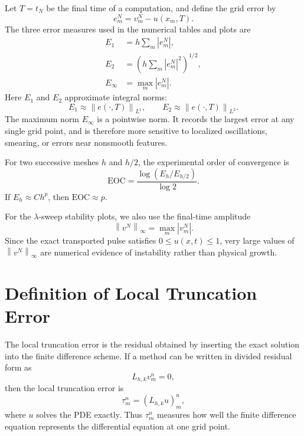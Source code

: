 \documentclass[11pt]{article}
\newcommand{\eoc}{\mathrm{EOC}}
\newcommand{\norm}[1]{\left\lVert #1\right\rVert}
\begin{document}
Let $T=t_N$ be the final time of a computation, and define the grid error by
\begin{equation}
    e_m^N=v_m^N-u(x_m,T).
\end{equation}
The three error measures used in the numerical tables and plots are
\begin{align}
    E_1
    &=
    h\sum_m |e_m^N|,
    \\
    E_2
    &=
    \left(h\sum_m |e_m^N|^2\right)^{1/2},
    \\
    E_\infty
    &=
    \max_m |e_m^N|.
\end{align}
Here $E_1$ and $E_2$ approximate integral norms:
\begin{equation}
    E_1\approx \norm{e(\cdot,T)}_{L^1},
    \qquad
    E_2\approx \norm{e(\cdot,T)}_{L^2}.
\end{equation}
The maximum norm $E_\infty$ is a pointwise norm.  It records the largest error at any
single grid point, and is therefore more sensitive to localized oscillations,
smearing, or errors near nonsmooth features.

For two successive meshes $h$ and $h/2$, the experimental order of convergence is
\begin{equation}
    \eoc
    =
    \frac{\log(E_h/E_{h/2})}{\log 2}.
\end{equation}
If $E_h\approx C h^p$, then $\eoc\approx p$.

For the $\lambda$-sweep stability plots, we also use the final-time amplitude
\begin{equation}
    \norm{v^N}_\infty=\max_m |v_m^N|.
\end{equation}
Since the exact transported pulse satisfies $0\le u(x,t)\le1$, very large values of
$\norm{v^N}_\infty$ are numerical evidence of instability rather than physical growth.

\section{Definition of Local Truncation Error}

The local truncation error is the residual obtained by inserting the exact solution
into the finite difference scheme.  If a method can be written in divided residual
form as
\begin{equation}
    L_{h,k}v_m^n=0,
\end{equation}
then the local truncation error is
\begin{equation}
    \tau_m^n=(L_{h,k}u)_m^n,
\end{equation}
where $u$ solves the PDE exactly.  Thus $\tau_m^n$ measures how well the finite
difference equation represents the differential equation at one grid point.
\end{document}
